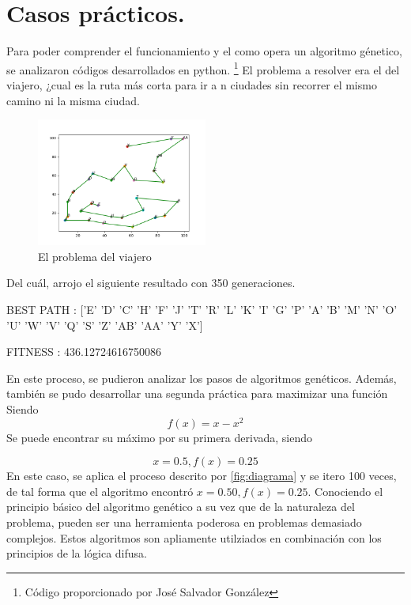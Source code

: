 \documentclass{article}
\begin{document}
    \section{Casos prácticos.}
    Para poder comprender el funcionamiento y el como opera un algoritmo génetico, se analizaron códigos desarrollados en python. \footnote{Código proporcionado por José Salvador González}
    El problema a resolver era el del viajero, ¿cual es la ruta más corta para ir a n ciudades sin recorrer el mismo camino ni la misma ciudad.
\begin{figure}[H]
    \centering
    \includegraphics[width=0.5\textwidth]{Figure_2.png} %
    \caption{El problema del viajero}
    \label{fig:miimagen}
\end{figure}
Del cuál, arrojo el siguiente resultado con 350 generaciones.

BEST PATH : ['E' 'D' 'C' 'H' 'F' 'J' 'T' 'R' 'L' 'K' 'I' 'G' 'P' 'A' 'B' 'M' 'N' 'O'
 'U' 'W' 'V' 'Q' 'S' 'Z' 'AB' 'AA' 'Y' 'X']

FITNESS : 436.12724616750086

En este proceso, se pudieron analizar los pasos de algoritmos genéticos. Además, también se pudo desarrollar una segunda práctica para maximizar una función
Siendo $$f(x)=x-x^2 $$
Se puede encontrar su máximo por su primera derivada, siendo 

$$x=0.5, f(x)=0.25$$
En este caso, se aplica el proceso descrito por \ref{fig:diagrama} y se itero 100 veces, de tal forma que el algoritmo encontró $ x=0.50 ,f (x)=0.25$.
Conociendo el principio básico del algoritmo genético a su vez que de la naturaleza del problema, pueden ser una herramienta poderosa en problemas demasiado complejos. Estos algoritmos son apliamente utilziados en combinación con los principios de la lógica difusa.


\end{document}
